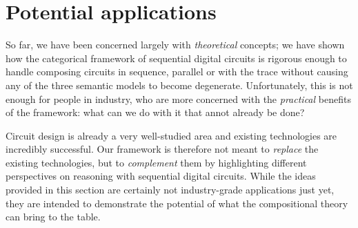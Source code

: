 \chapter{Potential applications}\label{sec:semantics-applications}

So far, we have been concerned largely with \emph{theoretical} concepts; we have
shown how the categorical framework of sequential digital circuits is rigorous
enough to handle composing circuits in sequence, parallel or with the trace
without causing any of the three semantic models to become degenerate.
Unfortunately, this is not enough for people in industry, who are more concerned
with the \emph{practical} benefits of the framework: what can we do with it that
annot already be done?

Circuit design is already a very well-studied area and existing technologies are
incredibly successful.
Our framework is therefore not meant to \emph{replace} the existing
technologies, but to \emph{complement} them by highlighting different
perspectives on reasoning with sequential digital circuits.
While the ideas provided in this section are certainly not industry-grade
applications just yet, they are intended to demonstrate the potential of what
the compositional theory can bring to the table.









